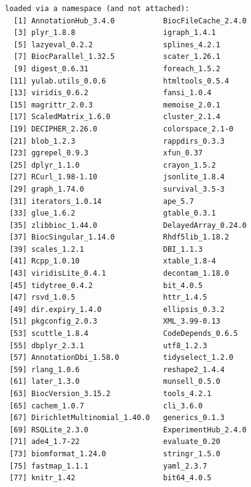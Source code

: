 \documentclass[
]{book}
\begin{document}
\begin{verbatim}
loaded via a namespace (and not attached):
  [1] AnnotationHub_3.4.0           BiocFileCache_2.4.0          
  [3] plyr_1.8.8                    igraph_1.4.1                 
  [5] lazyeval_0.2.2                splines_4.2.1                
  [7] BiocParallel_1.32.5           scater_1.26.1                
  [9] digest_0.6.31                 foreach_1.5.2                
 [11] yulab.utils_0.0.6             htmltools_0.5.4              
 [13] viridis_0.6.2                 fansi_1.0.4                  
 [15] magrittr_2.0.3                memoise_2.0.1                
 [17] ScaledMatrix_1.6.0            cluster_2.1.4                
 [19] DECIPHER_2.26.0               colorspace_2.1-0             
 [21] blob_1.2.3                    rappdirs_0.3.3               
 [23] ggrepel_0.9.3                 xfun_0.37                    
 [25] dplyr_1.1.0                   crayon_1.5.2                 
 [27] RCurl_1.98-1.10               jsonlite_1.8.4               
 [29] graph_1.74.0                  survival_3.5-3               
 [31] iterators_1.0.14              ape_5.7                      
 [33] glue_1.6.2                    gtable_0.3.1                 
 [35] zlibbioc_1.44.0               DelayedArray_0.24.0          
 [37] BiocSingular_1.14.0           Rhdf5lib_1.18.2              
 [39] scales_1.2.1                  DBI_1.1.3                    
 [41] Rcpp_1.0.10                   xtable_1.8-4                 
 [43] viridisLite_0.4.1             decontam_1.18.0              
 [45] tidytree_0.4.2                bit_4.0.5                    
 [47] rsvd_1.0.5                    httr_1.4.5                   
 [49] dir.expiry_1.4.0              ellipsis_0.3.2               
 [51] pkgconfig_2.0.3               XML_3.99-0.13                
 [53] scuttle_1.8.4                 CodeDepends_0.6.5            
 [55] dbplyr_2.3.1                  utf8_1.2.3                   
 [57] AnnotationDbi_1.58.0          tidyselect_1.2.0             
 [59] rlang_1.0.6                   reshape2_1.4.4               
 [61] later_1.3.0                   munsell_0.5.0                
 [63] BiocVersion_3.15.2            tools_4.2.1                  
 [65] cachem_1.0.7                  cli_3.6.0                    
 [67] DirichletMultinomial_1.40.0   generics_0.1.3               
 [69] RSQLite_2.3.0                 ExperimentHub_2.4.0          
 [71] ade4_1.7-22                   evaluate_0.20                
 [73] biomformat_1.24.0             stringr_1.5.0                
 [75] fastmap_1.1.1                 yaml_2.3.7                   
 [77] knitr_1.42                    bit64_4.0.5                  

\end{verbatim}
\end{document}

